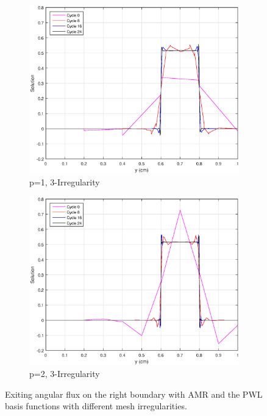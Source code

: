 \begin{figure}
{}
\vspace{2.5mm}
{
	\begin{subfigure}[b]{0.45\textwidth}
		\centering
		\label{subfig::SL_uniform_ef_pwl1_irr3}
		\includegraphics[width=\textwidth]{figures/sec_BF/SL_AMR_PWLD_k1_Irr3.eps}
		\caption{p=1, 3-Irregularity}
	\end{subfigure}
	\hfill
	\begin{subfigure}[b]{0.45\textwidth}
		\centering
		\label{subfig::SL_uniform_ef_pwl2_irr3}
		\includegraphics[width=\textwidth]{figures/sec_BF/SL_AMR_PWLD_k2_Irr3.eps}
		\caption{p=2, 3-Irregularity}
	\end{subfigure}
}
\caption{Exiting angular flux on the right boundary with AMR and the PWL basis functions with different mesh irregularities.}
\label{fig::BF_Results_SL_AMR_PWL_exit_flux}
\end{figure}

